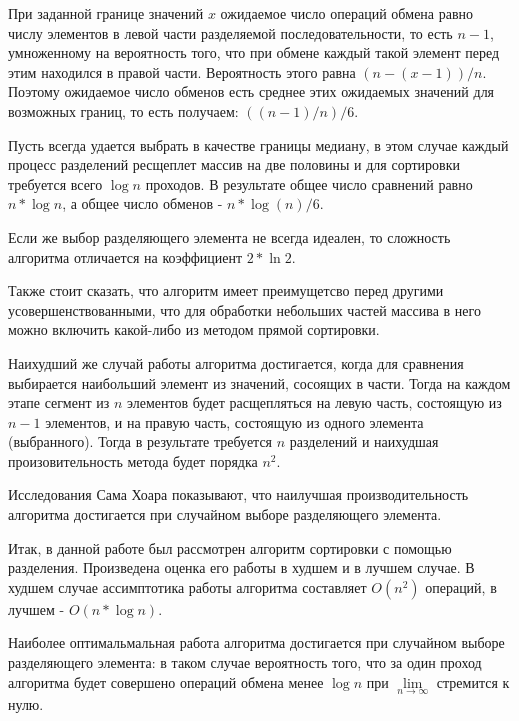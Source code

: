 \documentclass[bachelor, och, labwork]{shiza}
\begin{document}
При заданной границе значений $x$ ожидаемое число операций обмена равно числу 
элементов в левой части разделяемой последовательности, то есть $n-1$,
умноженному на вероятность того, что при обмене каждый такой элемент перед этим
находился в правой части. Вероятность этого равна $(n-(x-1))/n$. Поэтому 
ожидаемое число обменов есть среднее этих ожидаемых значений для возможных
границ, то есть получаем: $((n-1)/n)/6$.

Пусть всегда удается выбрать в качестве границы медиану, в этом случае каждый 
процесс разделений ресщеплет массив на две половины и для сортировки требуется
всего $\log n$ проходов. В результате общее число сравнений равно $n*\log n$,
а общее число обменов - $n * \log (n)/6$.

Если же выбор разделяющего элемента не всегда идеален, то сложность алгоритма
отличается на коэффициент $2* \ln 2$.

Также стоит сказать, что алгоритм имеет преимущетсво перед другими
усовершенствованными, что для обработки небольших частей массива в него можно 
включить какой-либо из методом прямой сортировки.

Наихудший же случай работы алгоритма достигается, когда для сравнения выбирается
наибольший элемент из значений, сосоящих в части. Тогда на каждом этапе сегмент 
из $n$ элементов будет расщепляться на левую часть, состоящую из $n-1$ элементов,
и на правую часть, состоящую из одного элемента (выбранного). Тогда в результате
требуется $n$ разделений и наихудшая произовительность метода будет порядка 
$n^2$. 

Исследования Сама Хоара показывают, что наилучшая производительность алгоритма
достигается при случайном выборе разделяющего элемента.

\conclusion

Итак, в данной работе был рассмотрен алгоритм сортировки с помощью разделения.
Произведена оценка его работы в худшем и в лучшем случае. В худшем случае
ассимптотика работы алгоритма составляет $O(n^2)$ операций, 
в лучшем - $O(n*\log n)$.

Наиболее оптимальмальная работа алгоритма достигается при случайном выборе
разделяющего элемента: в таком случае вероятность того, что за один проход
алгоритма будет совершено операций обмена менее $\log n$ при 
$\lim\limits_{n\rightarrow\infty }$ стремится к нулю.
\end{document}
